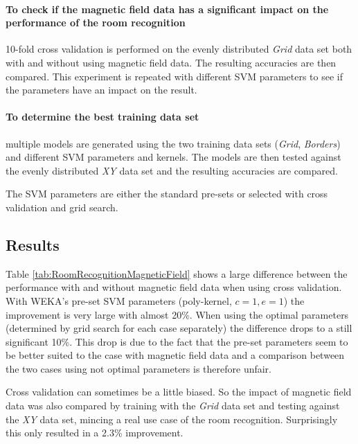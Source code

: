 \paragraph{To check if the magnetic field data has a significant impact on the performance of the room recognition} 10-fold cross validation is performed on the evenly distributed \emph{Grid} data set both with and without using magnetic field data. The resulting accuracies are then compared. This experiment is repeated with different SVM parameters to see if the parameters have an impact on the result. 

\paragraph{To determine the best training data set} multiple models are generated using the two training data sets (\emph{Grid}, \emph{Borders}) and different SVM parameters and kernels. The models are then tested against the evenly distributed \emph{XY} data set and the resulting accuracies are compared.

The SVM parameters are either the standard pre-sets or selected with cross validation and grid search.

\subsection{Results}

Table \ref{tab:RoomRecognitionMagneticField} shows a large difference between the performance with and without magnetic field data when using cross validation. With WEKA's pre-set SVM parameters (poly-kernel, $c=1,e=1$) the improvement is very large with almost 20\%. When using the optimal parameters (determined by grid search for each case separately) the difference drops to a still significant 10\%. This drop is due to the fact that the pre-set parameters seem to be better suited to the case with magnetic field data and a comparison between the two cases using not optimal parameters is therefore unfair.

Cross validation can sometimes be a little biased. So the impact of magnetic field data was also compared by training with the \emph{Grid} data set and testing against the \emph{XY} data set, mincing a real use case of the room recognition. Surprisingly this only resulted in a 2.3\% improvement.



